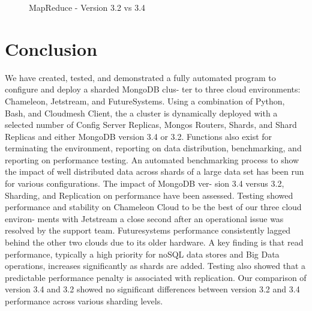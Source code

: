 \documentclass[sigconf]{acmart}
\begin{document}
\begin{figure}[htbp]
\centering
{}
\caption{MapReduce - Version 3.2 vs 3.4}
\label{fig:version-mapreduce}
\end{figure}

\section{Conclusion}

We have created, tested, and demonstrated a fully automated program to
configure and deploy a sharded MongoDB clus- ter to three cloud
environments: Chameleon, Jetstream, and FutureSystems. Using a
combination of Python, Bash, and Cloudmesh Client, the a cluster is
dynamically deployed with a selected number of Config Server Replicas,
Mongos Routers, Shards, and Shard Replicas and either MongoDB version
3.4 or 3.2. Functions also exist for terminating the environment,
reporting on data distribution, benchmarking, and reporting on
performance testing.  An automated benchmarking process to show the
impact of well distributed data across shards of a large data set has
been run for various configurations. The impact of MongoDB ver- sion
3.4 versus 3.2, Sharding, and Replication on performance have been
assessed. Testing showed performance and stability on Chameleon Cloud
to be the best of our three cloud environ- ments with Jetstream a
close second after an operational issue was resolved by the support
team. Futuresystems performance consistently lagged behind the other
two clouds due to its older hardware. A key finding is that read
performance, typically a high priority for noSQL data stores and Big
Data operations, increases significantly as shards are added. Testing
also showed that a predictable performance penalty is associated with
replication. Our comparison of version 3.4 and 3.2 showed no
significant differences between version 3.2 and 3.4 performance across
various sharding levels.




 
\end{document}
